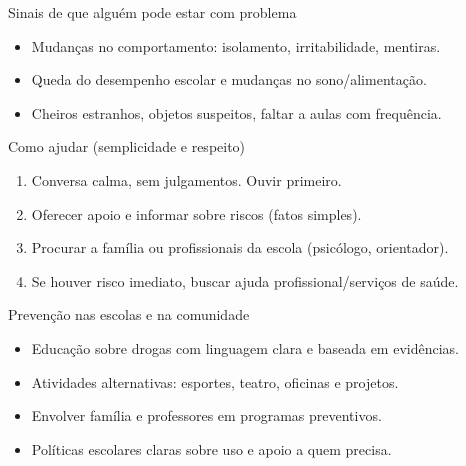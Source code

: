 \documentclass[aspectratio=169]{beamer}
\begin{document}
\begin{frame}{Sinais de que alguém pode estar com problema}
  \begin{itemize}
    \item Mudanças no comportamento: isolamento, irritabilidade, mentiras.
    \item Queda do desempenho escolar e mudanças no sono/alimentação.
    \item Cheiros estranhos, objetos suspeitos, faltar a aulas com frequência.
  \end{itemize}
\end{frame}

\begin{frame}{Como ajudar (semplicidade e respeito)}
  \begin{enumerate}
    \item Conversa calma, sem julgamentos. Ouvir primeiro.
    \item Oferecer apoio e informar sobre riscos (fatos simples).
    \item Procurar a família ou profissionais da escola (psicólogo, orientador).
    \item Se houver risco imediato, buscar ajuda profissional/serviços de saúde.
  \end{enumerate}
\end{frame}

\begin{frame}{Prevenção nas escolas e na comunidade}
  \begin{itemize}
    \item Educação sobre drogas com linguagem clara e baseada em evidências.
    \item Atividades alternativas: esportes, teatro, oficinas e projetos.
    \item Envolver família e professores em programas preventivos.
    \item Políticas escolares claras sobre uso e apoio a quem precisa.
  \end{itemize}
\end{frame}
\end{document}
